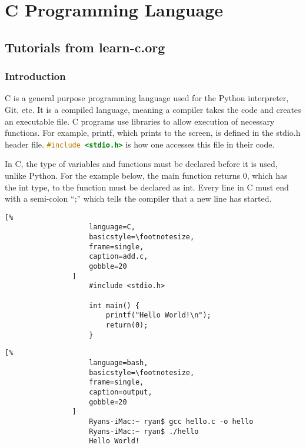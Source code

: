 \documentclass[crop=false,class=book]{standalone}
\begin{document}
\chapter{C Programming Language}
    \section{Tutorials from learn-c.org}
        \subsection{Introduction}
            C is a general purpose programming language used for the
            Python interpreter, Git, etc. It is a compiled language,
            meaning a compiler takes the code and creates an
            executable file. C programs use libraries to allow
            execution of necessary functions. For example, printf,
            which prints to the screen, is defined in the stdio.h
            header file.
            \lstinline[language=C]{#include <stdio.h>}
            is how one accesses this
            file in their code.\par\hfill\par
            In C, the type of variables and functions must be
            declared before it is used, unlike Python. For the
            example below, the main function returns 0, which has the
            int type, to the function must be declared as int. Every
            line in C must end with a semi-colon ``;'' which tells
            the compiler that a new line has started.
            \newline
            \begin{minipage}[t]{.48\textwidth}
                \centering
                \begin{lstlisting}[%
                    language=C,
                    basicstyle=\footnotesize,
                    frame=single,
                    caption=add.c,
                    gobble=20
                ]
                    #include <stdio.h>
                    
                    int main() {
                        printf("Hello World!\n");
                        return(0);
                    }
                \end{lstlisting}
            \end{minipage}\hfill
            \begin{minipage}[t]{.48\textwidth}
                \centering
                \begin{lstlisting}[%
                    language=bash,
                    basicstyle=\footnotesize,
                    frame=single,
                    caption=output,
                    gobble=20
                ]
                    Ryans-iMac:~ ryan$ gcc hello.c -o hello
                    Ryans-iMac:~ ryan$ ./hello
                    Hello World!
                \end{lstlisting}
            \end{minipage}
\end{document}
